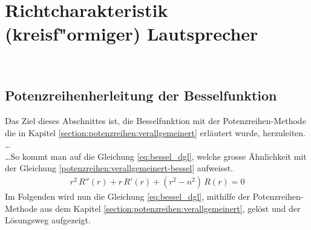 \chapter{Richtcharakteristik (kreisf"ormiger) Lautsprecher \label{chapter:kreis}}
\begin{refsection}
\\
%
%
%
%
%
\section{Potenzreihenherleitung der Besselfunktion}
Das Ziel dieses Abschnittes ist, die Besselfunktion mit der Potenzreihen-Methode die in Kapitel \ref{section:potenzreihen:verallgemeinert} erl\"autert wurde, herzuleiten.
\dots \\
%
\dots So kommt man auf die Gleichung \ref{eq:bessel_dgl}, welche grosse \"Ahnlichkeit mit der Gleichung \ref{potenzreihen:verallgemeinert-bessel} aufweisst.
\begin{align}
	r^2 \, R'' \left( r \right)
	+
	r \, R' \left( r \right)
	+
	\left( r^2 - n^2 \right) \, R \left( r \right)
	=
	0
	\label{eq:bessel_dgl}
\end{align}
Im Folgenden wird nun die Gleichung \ref{eq:bessel_dgl}, mithilfe der Potenzreihen-Methode aus dem Kapitel \ref{section:potenzreihen:verallgemeinert}, gel\"ost und der L\"osungsweg aufgezeigt.

\end{refsection}
